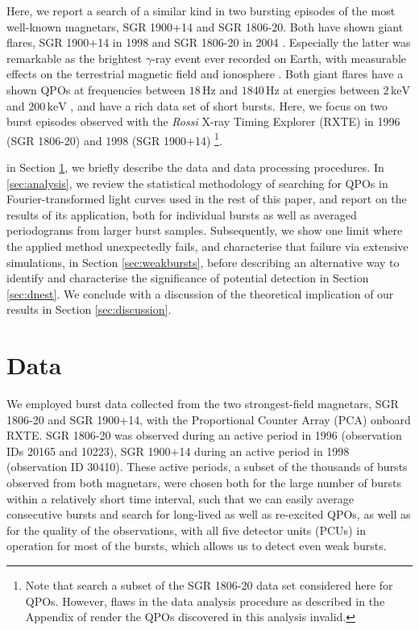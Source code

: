 \documentclass[numberedappendix]{emulateapj}
\newcommand{\hz}{\,\mathrm{Hz}}
\begin{document}
Here, we report a search of a similar kind in two bursting episodes of the most well-known magnetars, SGR 1900+14 and SGR 1806-20. Both have shown giant flares, SGR 1900+14 in 1998 \citep{cline1998,hurley1999,feroci1999} and SGR 1806-20 in 2004 \citep{palmer2005,hurley2004,hurley2005,mazets2005,borkowski2004,mereghetti2005,cameron2005}. Especially the latter was remarkable as the brightest $\gamma$-ray event ever recorded on Earth, with measurable effects on the terrestrial magnetic field and ionosphere \citep{mandea2006,inan2007}. Both giant flares have a shown QPOs at frequencies between $18\hz$ and $1840\hz$ at energies between $2 \, \mathrm{keV}$ and $200 \, \mathrm{keV}$ \citep{strohmayer2005,israel2005,strohmayer2006,watts2006}, and have a rich data set of short bursts.
Here, we focus on two burst episodes observed with the {\it Rossi} X-ray Timing Explorer (RXTE) in 1996 (SGR 1806-20) \citep{gogus2000} and 1998 (SGR 1900+14) \citep{gogus1999} \footnote{Note that \citet{elmezeini2010} search a subset of the SGR 1806-20 data set considered here for QPOs. However, flaws in the data analysis procedure as described in the Appendix of \citet{huppenkothen2013} render the QPOs discovered in this analysis invalid.}. 

in Section \ref{sec:data}, we briefly describe the data and data processing procedures. In \ref{sec:analysis}, we review the statistical methodology of searching for QPOs in Fourier-transformed light curves used in the rest of this paper, and report on the results of its application, both for individual bursts as well as averaged periodograms from larger burst samples. Subsequently, we show one limit where the applied method unexpectedly fails, and characterise that failure via extensive simulations, in Section \ref{sec:weakbursts}, before describing an alternative way to identify and characterise the significance of potential detection in Section \ref{sec:dnest}. We conclude with a discussion of the theoretical implication of our results in Section \ref{sec:discussion}.


\section{Data}
\label{sec:data}

We employed burst data collected from the two strongest-field magnetars, SGR 1806-20 and SGR 1900+14,  with the Proportional Counter Array (PCA) onboard RXTE. SGR 1806-20 was observed during an active period in 1996 (observation IDs 20165 and 10223), SGR 1900+14 during an active period in 1998 (observation ID 30410). These active periods, a subset of the thousands of bursts observed from both magnetars, were chosen both for the large number of bursts within a relatively short time interval, such that we can easily average consecutive bursts and search for long-lived as well as re-excited QPOs, as well as for the quality of the observations, with all five detector units (PCUs) in operation for most of the bursts, which allows us to detect even weak bursts.
\end{document}
